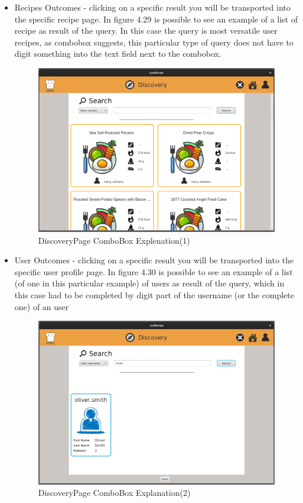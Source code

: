 \documentclass[a4paper]{report}
\begin{document}
\begin{itemize}
	\item Recipes Outcomes - clicking on a specific result you will be transported into the specific recipe page.
	\subitem In figure 4.29 is possible to see an example of a list of recipe as result of the query. In this case the query is most versatile user recipes, as combobox suggests, this particular type of query does not have to digit something into the text field next to the combobox.
	\begin{figure}[htpb]
		\centering
		\includegraphics[scale=0.37]{img/user_manual/combobox1.png}
		\caption{DiscoveryPage ComboBox Explenation(1)}
	\end{figure}
	\item User Outcomes - clicking on a specific result you will be transported into the specific user profile page.
	\subitem In figure 4.30 is possible to see an example of a list (of one in this particular example) of users as result of the query, which in this case had to be completed by digit part of the username (or the complete one) of an user
	\begin{figure}[htpb]
		\centering
		\includegraphics[scale=0.37]{img/user_manual/combobox2.png}
		\caption{DiscoveryPage ComboBox Explanation(2)}
	\end{figure}
\end{itemize}
\end{document}
